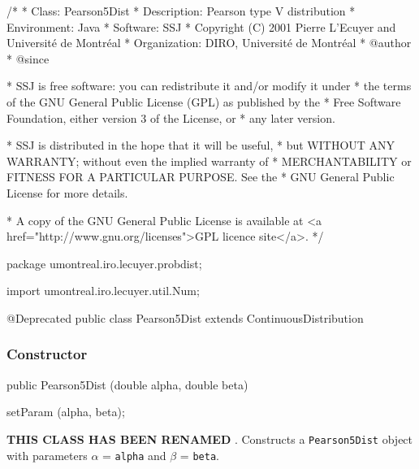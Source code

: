 \begin{code}
\begin{hide}
/*
 * Class:        Pearson5Dist
 * Description:  Pearson type V distribution
 * Environment:  Java
 * Software:     SSJ 
 * Copyright (C) 2001  Pierre L'Ecuyer and Université de Montréal
 * Organization: DIRO, Université de Montréal
 * @author       
 * @since

 * SSJ is free software: you can redistribute it and/or modify it under
 * the terms of the GNU General Public License (GPL) as published by the
 * Free Software Foundation, either version 3 of the License, or
 * any later version.

 * SSJ is distributed in the hope that it will be useful,
 * but WITHOUT ANY WARRANTY; without even the implied warranty of
 * MERCHANTABILITY or FITNESS FOR A PARTICULAR PURPOSE.  See the
 * GNU General Public License for more details.

 * A copy of the GNU General Public License is available at
   <a href="http://www.gnu.org/licenses">GPL licence site</a>.
 */
\end{hide}
package umontreal.iro.lecuyer.probdist;
\begin{hide}
import umontreal.iro.lecuyer.util.Num;
\end{hide}
@Deprecated
public class Pearson5Dist extends ContinuousDistribution\begin{hide} {
   protected double alpha;
   protected double beta;
   protected double logam;   // Ln (Gamma(alpha))

\end{hide}\end{code}
\subsubsection* {Constructor}

\begin{code}

   public Pearson5Dist (double alpha, double beta)\begin{hide} {
      setParam (alpha, beta);
   }\end{hide}
\end{code}
\begin{tabb}
\textbf{THIS CLASS HAS BEEN RENAMED }.
   Constructs a \texttt{Pearson5Dist} object with parameters
   $\alpha$ = \texttt{alpha} and $\beta$ = \texttt{beta}.
\end{tabb}

